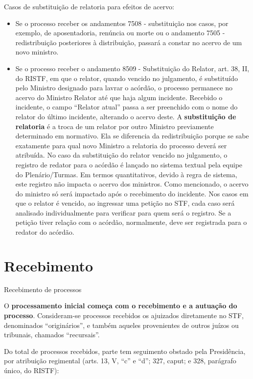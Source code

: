 \documentclass[
]{book}
\providecommand{\tightlist}{%
  \setlength{\itemsep}{0pt}\setlength{\parskip}{0pt}}
\begin{document}
Casos de substituição de relatoria para efeitos de acervo:

\begin{itemize}
\tightlist
\item
  Se o processo receber os andamentos 7508 - substituição nos casos, por exemplo, de aposentadoria, renúncia ou morte ou o andamento 7505 - redistribuição posteriores à distribuição, passará a constar no acervo de um novo ministro.
\item
  Se o processo receber o andamento 8509 - Substituição do Relator, art. 38, II, do RISTF, em que o relator, quando vencido no julgamento, é substituído pelo Ministro designado para lavrar o acórdão, o processo permanece no acervo do Ministro Relator até que haja algum incidente. Recebido o incidente, o campo ``Relator atual'' passa a ser preenchido com o nome do relator do último incidente, alterando o acervo deste.
  A \textbf{substituição de relatoria} é a troca de um relator por outro Ministro previamente determinado em normativo. Ela se diferencia da redistribuição porque se sabe exatamente para qual novo Ministro a relatoria do processo deverá ser atribuída.
  No caso da substituição do relator vencido no julgamento, o registro de redator para o acórdão é lançado no sistema textual pela equipe do Plenário/Turmas. Em termos quantitativos, devido à regra de sistema, este registro não impacta o acervo dos ministros. Como mencionado, o acervo do ministro só será impactado após o recebimento do incidente. Nos casos em que o relator é vencido, ao ingressar uma petição no STF, cada caso será analisado individualmente para verificar para quem será o registro. Se a petição tiver relação com o acórdão, normalmente, deve ser registrada para o redator do acórdão.
\end{itemize}

\hypertarget{recebimento}{%
\chapter{Recebimento}\label{recebimento}}

Recebimento de processos

O \textbf{processamento inicial começa com o recebimento e a autuação do processo}. Consideram-se processos recebidos os ajuizados diretamente no STF, denominados ``originários'', e também aqueles provenientes de outros juízos ou tribunais, chamados ``recursais''.

Do total de processos recebidos, parte tem seguimento obstado pela Presidência, por atribuição regimental (arts. 13, V, ``c'' e ``d''; 327, caput; e 328, parágrafo único, do RISTF):
\end{document}
